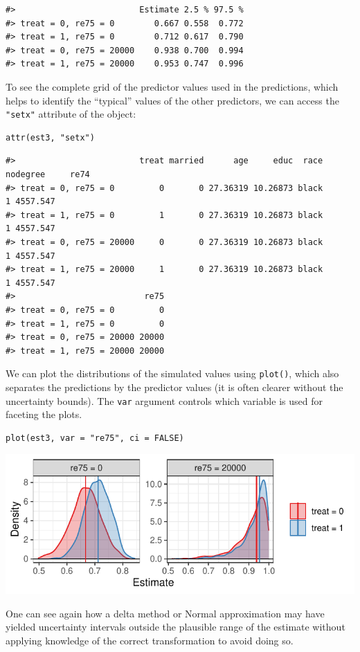 \begin{verbatim}
#>                         Estimate 2.5 % 97.5 %
#> treat = 0, re75 = 0        0.667 0.558  0.772
#> treat = 1, re75 = 0        0.712 0.617  0.790
#> treat = 0, re75 = 20000    0.938 0.700  0.994
#> treat = 1, re75 = 20000    0.953 0.747  0.996
\end{verbatim}
To see the complete grid of the predictor values used in the predictions, which helps to identify the ``typical'' values of the other predictors, we can access the \texttt{"setx"} attribute of the object:
\begin{verbatim}
attr(est3, "setx")
\end{verbatim}
\begin{verbatim}
#>                         treat married      age     educ  race nodegree     re74
#> treat = 0, re75 = 0         0       0 27.36319 10.26873 black        1 4557.547
#> treat = 1, re75 = 0         1       0 27.36319 10.26873 black        1 4557.547
#> treat = 0, re75 = 20000     0       0 27.36319 10.26873 black        1 4557.547
#> treat = 1, re75 = 20000     1       0 27.36319 10.26873 black        1 4557.547
#>                          re75
#> treat = 0, re75 = 0         0
#> treat = 1, re75 = 0         0
#> treat = 0, re75 = 20000 20000
#> treat = 1, re75 = 20000 20000
\end{verbatim}
We can plot the distributions of the simulated values using \texttt{plot()}, which also separates the predictions by the predictor values (it is often clearer without the uncertainty bounds). The \texttt{var} argument controls which variable is used for faceting the plots.
\begin{verbatim}
plot(est3, var = "re75", ci = FALSE)
\end{verbatim}
\begin{center}\includegraphics{figures/plot3-1} \end{center}
One can see again how a delta method or Normal approximation may have yielded uncertainty intervals outside the plausible range of the estimate without applying knowledge of the correct transformation to avoid doing so.
